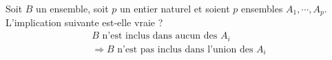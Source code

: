 Soit $B$ un ensemble, soit $p$ un entier naturel et soient $p$ ensembles $A_1,\cdots,A_p$.\\
L'implication suivante est-elle vraie ?
\begin{multline*}
 B \text{ n'est inclus dans aucun des }A_i \\
\Rightarrow
B \text{ n'est pas inclus dans l'union des }A_i
\end{multline*}
\bigskip \bigskip